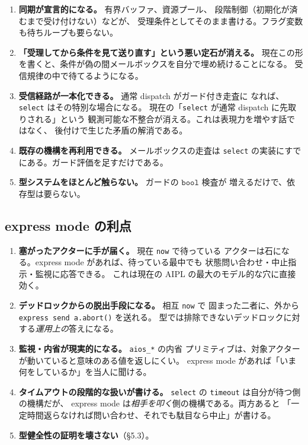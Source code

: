 \documentclass[11pt,a4paper]{ltjsarticle}
\theoremstyle{remark}
\newcommand{\ty}[1]{\ensuremath{\mathtt{#1}}}
\begin{document}
\begin{enumerate}
\item \textbf{同期が宣言的になる。} 有界バッファ、資源プール、
  段階制御（初期化が済むまで受け付けない）などが、
  受理条件としてそのまま書ける。フラグ変数も待ちループも要らない。

\item \textbf{「受理してから条件を見て送り直す」という悪い定石が消える。}
  現在この形を書くと、条件が偽の間メールボックスを自分で埋め続けることになる。
  受信規律の中で待てるようになる。

\item \textbf{受信経路が一本化できる。} 通常 dispatch がガード付き走査に
  なれば、\texttt{select} はその特別な場合になる。
  現在の「\texttt{select} が通常 dispatch に先取りされる」という
  観測可能な不整合が消える。これは表現力を増やす話ではなく、
  後付けで生じた矛盾の解消である。

\item \textbf{既存の機構を再利用できる。} メールボックスの走査は
  \texttt{select} の実装にすでにある。ガード評価を足すだけである。

\item \textbf{型システムをほとんど触らない。} ガードの \ty{bool} 検査が
  増えるだけで、依存型は要らない。
\end{enumerate}

\subsection{express mode の利点}

\begin{enumerate}
\item \textbf{塞がったアクターに手が届く。} 現在 \texttt{now} で待っている
  アクターは石になる。express mode があれば、待っている最中でも
  状態問い合わせ・中止指示・監視に応答できる。
  これは現在の AIPL の最大のモデル的な穴に直接効く。

\item \textbf{デッドロックからの脱出手段になる。} 相互 \texttt{now} で
  固まった二者に、外から \texttt{express send a.abort()} を送れる。
  型では排除できないデッドロックに対する\emph{運用上の}答えになる。

\item \textbf{監視・内省が現実的になる。} \texttt{aios\_*} の内省
  プリミティブは、対象アクターが動いていると意味のある値を返しにくい。
  express mode があれば「いま何をしているか」を当人に聞ける。

\item \textbf{タイムアウトの段階的な扱いが書ける。}
  \texttt{select} の \texttt{timeout} は自分が待つ側の機構だが、
  express mode は\emph{相手を叩く}側の機構である。両方あると
  「一定時間返らなければ問い合わせ、それでも駄目なら中止」が書ける。

\item \textbf{型健全性の証明を壊さない}（\S 5.3）。
\end{enumerate}
\end{document}
